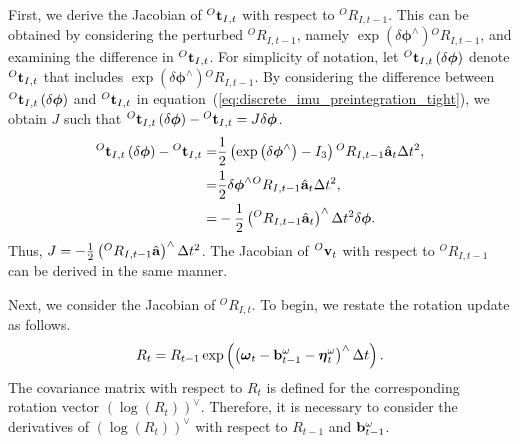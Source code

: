 First, we derive the Jacobian of ${}^{O}{\bf t}_{I, t}$ with respect to ${}^{O}R_{I, t-1}$.
This can be obtained by considering the perturbed ${}^{O}R_{I, t-1}$, namely $\exp \left( \delta \boldsymbol \phi^{\wedge} \right) {}^{O}R_{I, t-1}$, and examining the difference in ${}^{O}{\bf t}_{I, t}$.
For simplicity of notation, let ${}^{O}{\bf t}_{I, t} \left( \delta \boldsymbol \phi \right)$ denote ${}^{O}{\bf t}_{I, t}$ that includes $\exp \left( \delta \boldsymbol \phi^{\wedge} \right) {}^{O}R_{I, t-1}$.
By considering the difference between ${}^{O}{\bf t}_{I, t} \left( \delta \boldsymbol \phi \right)$ and ${}^{O}{\bf t}_{I, t}$ in equation~(\ref{eq:discrete_imu_preintegration_tight}), we obtain $J$ such that ${}^{O}{\bf t}_{I, t} \left( \delta \boldsymbol \phi \right) - {}^{O}{\bf t}_{I, t} = J \delta \boldsymbol \phi$.
%
\begin{align}
  \begin{split}
    {}^{O}{\bf t}_{I, t} \left( \delta \boldsymbol \phi \right) - {}^{O}{\bf t}_{I, t}
    = &
    \frac{1}{2} \left( \exp \left( \delta \boldsymbol \phi^{\wedge} \right) - I_{3} \right) {}^{O}R_{I, t-1} \hat{ {\bf a} }_{t} \Delta t^{2}, \\
    = &
    \frac{1}{2} \delta \boldsymbol \phi^{\wedge} {}^{O}R_{I, t-1} \hat{ {\bf a} }_{t} \Delta t^{2}, \\
    = & - \frac{1}{2} \left( {}^{O}R_{I, t-1} \hat{ {\bf a} }_{t} \right)^{\wedge} \Delta t^{2} \delta \boldsymbol \phi.
  \end{split}
\end{align}
%
Thus, $J = - \frac{1}{2} \left( {}^{O}R_{I, t-1} \hat{ {\bf a} } \right)^{\wedge} \Delta t^{2}$.
The Jacobian of ${}^{O}{\bf v}_{t}$ with respect to ${}^{O}R_{I, t-1}$ can be derived in the same manner.

Next, we consider the Jacobian of ${}^{O}R_{I, t}$.
To begin, we restate the rotation update as follows.
%
\begin{align}
  R_{t} = R_{t-1} \exp \left( \left( \boldsymbol \omega_{t} - {\bf b}_{t-1}^{\omega} - \boldsymbol \eta_{t}^{\omega} \right)^{\wedge} \Delta t \right).
\end{align}
%
The covariance matrix with respect to $R_{t}$ is defined for the corresponding rotation vector $\left( \log \left( R_{t} \right) \right)^{\vee}$.
Therefore, it is necessary to consider the derivatives of $\left( \log \left( R_{t} \right) \right)^{\vee}$ with respect to $R_{t-1}$ and ${\bf b}_{t-1}^{\omega}$.

